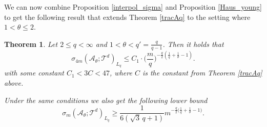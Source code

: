 \documentclass[11pt,reqno]{article}
\numberwithin{equation}{section}
\theoremstyle{definition}
\theoremstyle{plain}
\newtheorem{satz}{Theorem}[section]
\newcommand{\ca}{\ensuremath{\mathcal A}}
\begin{document}
We can now combine Proposition \ref{interpol_sigma} and Proposition \ref{Haus_young} to get the following result that extends Theorem \ref{tracAq} to the setting where \( 1 < \theta \leq 2\).




\begin{satz}\label{extend_trac}
  Let \(2 \leq q < \infty\) and \(1 < \theta < q'= \frac{q}{q-1}\). Then it holds that
  \begin{equation}\label{thm:4.4_interpol}
      \sigma_{4m}(\ca_\theta;\mathcal{T}^d)_{L_q} \leq C_1 \cdot \Big(\frac{m}{q}\Big)^{-\frac{q}{2}\left(\frac{1}{q}+\frac{1}{\theta}-1\right)}.
  \end{equation} 
  with some constant \(C_1  < 3C < 47 \), where \(C\) is the constant from Theorem \ref{tracAq} above.

 Under the same conditions we also get the following lower bound \begin{equation}\label{thm:4.4_interpol__}
      \sigma_{m}(\ca_\theta;\mathcal{T}^d)_{L_q} \geq
      \frac{1}{ 6 (\sqrt{3}\, q + 1) }
 m^{ -\frac{q}{2}\big(\frac{1}{q}+\frac{1}{\theta}-1\big)} .
  \end{equation}  

\end{satz}
\end{document}
